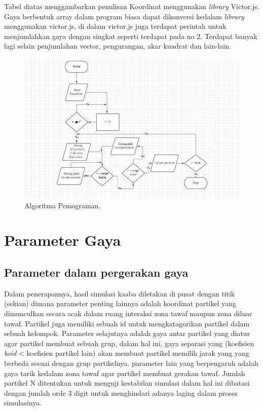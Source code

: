\hspace{0.6cm}Tabel diatas menggambarkan penulisan Koordinat menggunakan \emph{library} Victor.js\citep{noauthororeditor2014victorjs}. Gaya berbentuk array dalam program biasa dapat dikonversi kedalam \emph{library} menggunakan victor.js, di dalam victor.js juga terdapat perintah untuk menjumlahkan gaya dengan singkat seperti terdapat pada no 2. Terdapat banyak lagi selain penjumlahan vector, pengurangan, akar kuadrat dan lain-lain.  



\begin{figure}
\centering
\includegraphics[scale=0.75]{gambar/diagram} %
\caption{Algoritma Pemograman.}
\end{figure}

\section{Parameter Gaya}
\subsection{Parameter dalam pergerakan gaya}
\hspace{0.6cm}Dalam penerapannya, hasil simulasi kaaba diletakan di pusat dengan titik (sekian) dimana parameter penting lainnya adalah koordinat partikel yang dimunculkan secara acak dalam ruang interaksi zona tawaf maupun zona diluar tawaf. Partikel juga memiliki sebuah id untuk mengkatagorikan partikel dalam sebuah kelompok. Parameter selajutnya adalah gaya antar partikel yang diatur agar partikel membuat sebuah grup, dalam hal ini, gaya separasi yang (koefisien \emph{boid} < koefisien partikel lain) akan membuat partikel memilih jarak yang yang berbeda sesuai dengan grup partikelnya. parameter lain yang berpengaruh adalah gaya tarik kedalam zona tawaf agar partikel membuat gerakan tawaf. Jumlah partikel N ditentukan untuk menguji kestabilan simulasi dalam hal ini dibatasi dengan jumlah orde 3 digit untuk menghindari adanya laging dalam proses simulasinya.

